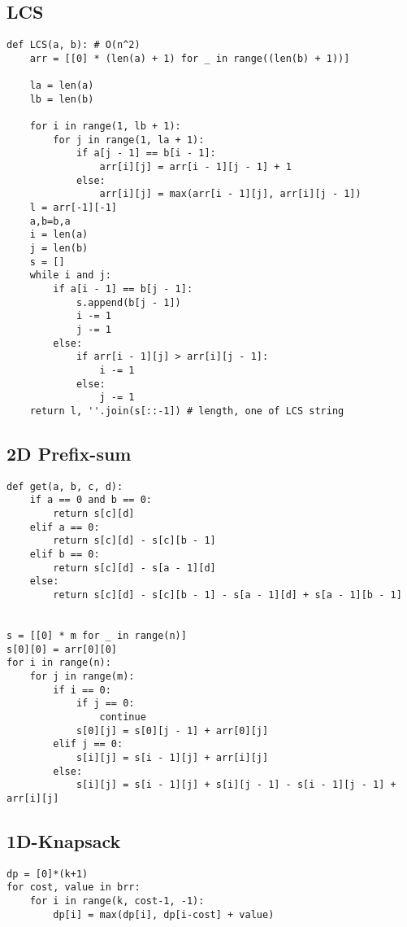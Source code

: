 \documentclass[landscape, 8pt, a4paper, oneside, twocolumn]{extarticle}
\begin{document}
\subsection{LCS}
\begin{verbatim}
def LCS(a, b): # O(n^2)
    arr = [[0] * (len(a) + 1) for _ in range((len(b) + 1))]

    la = len(a)
    lb = len(b)

    for i in range(1, lb + 1):
        for j in range(1, la + 1):
            if a[j - 1] == b[i - 1]:
                arr[i][j] = arr[i - 1][j - 1] + 1
            else:
                arr[i][j] = max(arr[i - 1][j], arr[i][j - 1])
    l = arr[-1][-1]
    a,b=b,a
    i = len(a)
    j = len(b)
    s = []
    while i and j:
        if a[i - 1] == b[j - 1]:
            s.append(b[j - 1])
            i -= 1
            j -= 1
        else:
            if arr[i - 1][j] > arr[i][j - 1]:
                i -= 1
            else:
                j -= 1
    return l, ''.join(s[::-1]) # length, one of LCS string
\end{verbatim}
\subsection{2D Prefix-sum}
\begin{verbatim}
def get(a, b, c, d):
    if a == 0 and b == 0:
        return s[c][d]
    elif a == 0:
        return s[c][d] - s[c][b - 1]
    elif b == 0:
        return s[c][d] - s[a - 1][d]
    else:
        return s[c][d] - s[c][b - 1] - s[a - 1][d] + s[a - 1][b - 1]


s = [[0] * m for _ in range(n)]
s[0][0] = arr[0][0]
for i in range(n):
    for j in range(m):
        if i == 0:
            if j == 0:
                continue
            s[0][j] = s[0][j - 1] + arr[0][j]
        elif j == 0:
            s[i][j] = s[i - 1][j] + arr[i][j]
        else:
            s[i][j] = s[i - 1][j] + s[i][j - 1] - s[i - 1][j - 1] + arr[i][j]

\end{verbatim}

\subsection{1D-Knapsack}
\begin{verbatim}
dp = [0]*(k+1)
for cost, value in brr:
    for i in range(k, cost-1, -1):
        dp[i] = max(dp[i], dp[i-cost] + value)
\end{verbatim}
\end{document}
